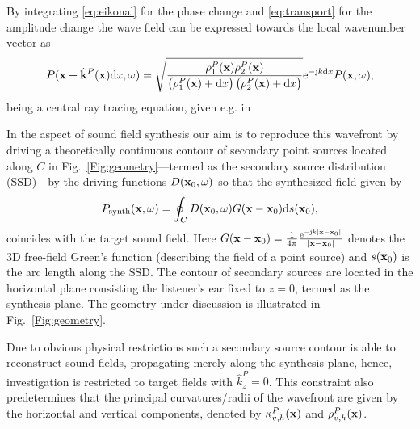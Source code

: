 \documentclass[lettersize,journal]{IEEEtran}
\begin{document}
By integrating \eqref{eq:eikonal} for the phase change and \eqref{eq:transport} for the amplitude change the wave field can be expressed towards the local wavenumber vector as
\begin{equation}
  \footnotesize
  P(\mathbf{x} + \hat{\mathbf{k}}^P(\mathbf{x}) \mathrm{d} x,\omega) = \sqrt{ \frac{\rho^P_1(\mathbf{x}) \rho^P_2(\mathbf{x})}{\left(\rho^P_1(\mathbf{x})+\mathrm{d} x\right) \left(\rho^P_2(\mathbf{x}) + \mathrm{d} x\right)} } \mathrm{e}^{-\mathrm{j} k \mathrm{d} x} P(\mathbf{x},\omega),
  \label{eq:ray_tracing}
\end{equation}
being a central ray tracing equation, given e.g. in \cite[Eq. 8.5.8]{Pierce2019}

In the aspect of sound field synthesis our aim is to reproduce this wavefront by driving a theoretically continuous contour of secondary point sources located along $C$ in Fig.~\ref{Fig:geometry}---termed as the secondary source distribution (SSD)---by the driving functions $D(\mathbf{x}_0,\omega)$ so that the synthesized field given by
\begin{equation}
  P_{\mathrm{synth}}(\mathbf{x},\omega) = \oint_C D(\mathbf{x}_0, \omega) G(\mathbf{x}-\mathbf{x}_0) \mathrm{d} s(\mathbf{x}_0),
  \label{eq:synth_field}
\end{equation}
coincides with the target sound field.
Here $G(\mathbf{x}-\mathbf{x}_0) = \frac{1}{4\pi} \frac{\mathrm{e}^{-\mathrm{j} k |\mathbf{x}-\mathbf{x}_0|}}{|\mathbf{x}-\mathbf{x}_0|}$ denotes the 3D free-field Green's function (describing the field of a point source) and $s(\mathbf{x}_0)$ is the arc length along the SSD.
The contour of secondary sources are located in the horizontal plane consisting the listener's ear fixed to $z = 0$, termed as the synthesis plane.
The geometry under discussion is illustrated in Fig.~\ref{Fig:geometry}.

Due to obvious physical restrictions such a secondary source contour is able to reconstruct sound fields, propagating merely along the synthesis plane, hence, investigation is restricted to target fields with $\hat{k}_z^P = 0$.
This constraint also predetermines that the principal curvatures/radii of the wavefront are given by the horizontal and vertical components, denoted by $\kappa^P_{v,h}(\mathbf{x})$ and $\rho^P_{v,h}(\mathbf{x})$.
\end{document}
